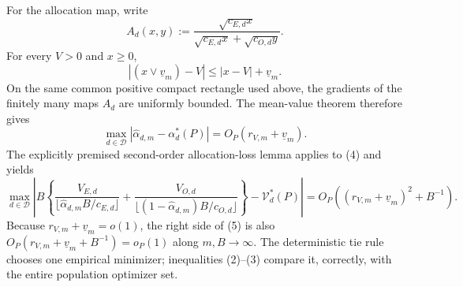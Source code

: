 For the allocation map, write
\[
 A_d(x,y):=
 \frac{\sqrt{c_{E,d}x}}
 {\sqrt{c_{E,d}x}+\sqrt{c_{O,d}y}}.
\]
For every \(V>0\) and \(x\ge0\),
\[
 |(x\vee\underline v_m)-V|
 \le |x-V|+\underline v_m.
\]
On the same common positive compact rectangle used above, the gradients of the finitely many maps \(A_d\) are uniformly bounded.  The mean-value theorem therefore gives
\[
 \max_{d\in\mathcal D}
 |\widehat\alpha_{d,m}-\alpha_d^*(P)|
 =O_P(r_{V,m}+\underline v_m).                                             \tag{4}
\]
The explicitly premised second-order allocation-loss lemma applies to (4) and yields
\[
 \max_{d\in\mathcal D}\left|
 B\left\{
 \frac{V_{E,d}}{\lfloor\widehat\alpha_{d,m}B/c_{E,d}\rfloor}
 +\frac{V_{O,d}}{\lfloor(1-\widehat\alpha_{d,m})B/c_{O,d}\rfloor}
 \right\}-\mathcal V_d^*(P)\right|
 =O_P\!\left((r_{V,m}+\underline v_m)^2+B^{-1}\right).                    \tag{5}
\]
Because \(r_{V,m}+\underline v_m=o(1)\), the right side of (5) is also
\(O_P(r_{V,m}+\underline v_m+B^{-1})=o_P(1)\) along \(m,B\to\infty\).  The deterministic tie rule chooses one empirical minimizer; inequalities (2)--(3) compare it, correctly, with the entire population optimizer set.